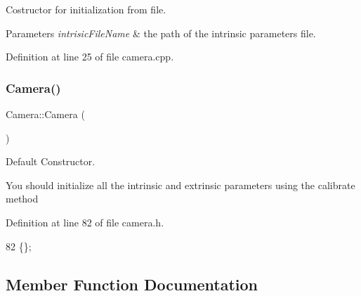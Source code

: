 Costructor for initialization from file. 


\begin{DoxyParams}{Parameters}
{\em intrisic\+File\+Name} & the path of the intrinsic parameters file. \\
\hline
\end{DoxyParams}


Definition at line 25 of file camera.\+cpp.


\mbox{\label{classCamera_a01f94c3543f56ede7af49dc778f19331}} 
\subsubsection{\texorpdfstring{Camera()}{Camera()}\hspace{0.1cm}{\footnotesize\ttfamily [2/2]}}
{\footnotesize\ttfamily Camera\+::\+Camera (\begin{DoxyParamCaption}{ }\end{DoxyParamCaption})\hspace{0.3cm}{\ttfamily [inline]}}



Default Constructor. 

You should initialize all the intrinsic and extrinsic parameters using the calibrate method 

Definition at line 82 of file camera.\+h.


\begin{DoxyCode}
82 \{\};
\end{DoxyCode}


\subsection{Member Function Documentation}
\mbox{\label{classCamera_a2498b18efe884472517a430db83d9c74}} 
